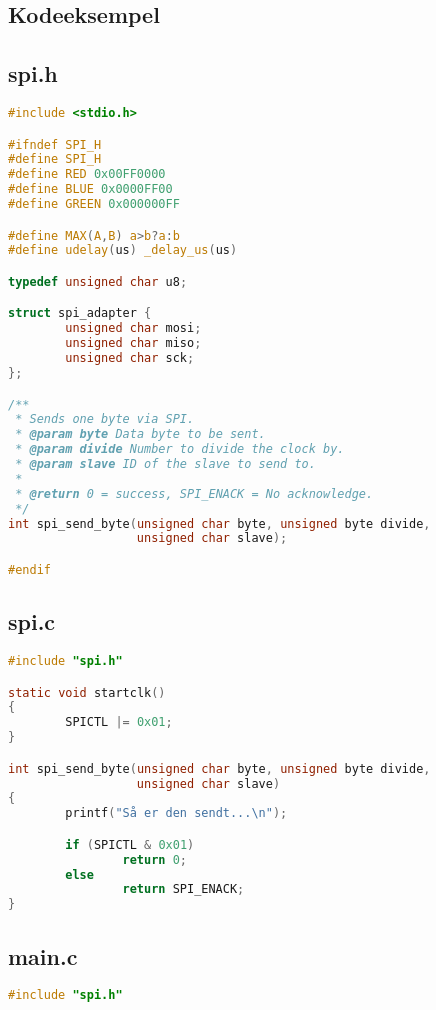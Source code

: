 \documentclass[article, 10pt]{memoir}
\begin{document}
\clearpage
\begin{landscape}
    \begin{multicols}{2}
        \chapter{Kodeeksempel}
        \section{spi.h}

        \begin{lstlisting}[language=c]
#include <stdio.h>

#ifndef SPI_H
#define SPI_H
#define RED 0x00FF0000
#define BLUE 0x0000FF00
#define GREEN 0x000000FF

#define MAX(A,B) a>b?a:b
#define udelay(us) _delay_us(us)

typedef unsigned char u8;

struct spi_adapter {
        unsigned char mosi;
        unsigned char miso;
        unsigned char sck;
};

/**
 * Sends one byte via SPI.
 * @param byte Data byte to be sent.
 * @param divide Number to divide the clock by.
 * @param slave ID of the slave to send to.
 *
 * @return 0 = success, SPI_ENACK = No acknowledge.
 */
int spi_send_byte(unsigned char byte, unsigned byte divide,
                  unsigned char slave);

#endif
        \end{lstlisting}

        \vfill
        \columnbreak
        \section{spi.c}
        \begin{lstlisting}[language=c]
#include "spi.h"

static void startclk()
{
        SPICTL |= 0x01;
}

int spi_send_byte(unsigned char byte, unsigned byte divide,
                  unsigned char slave)
{
        printf("Så er den sendt...\n");

        if (SPICTL & 0x01)
                return 0;
        else
                return SPI_ENACK;
}
        \end{lstlisting}

        \vfill
        \columnbreak

        \section{main.c}
        \begin{lstlisting}[language=c]
#include "spi.h"


\end{lstlisting}
\end{multicols}
\end{landscape}
\end{document}
